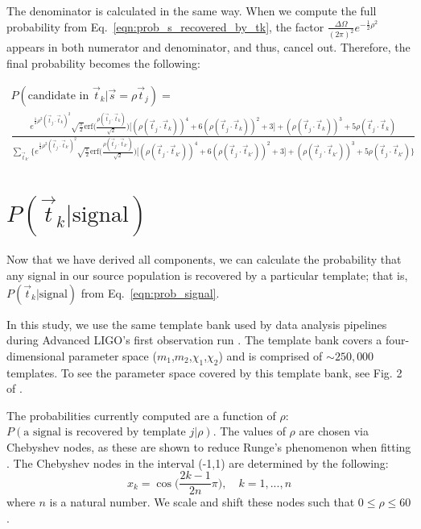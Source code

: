 \documentclass[twocolumn,showpacs,unsortedaddress,superscriptaddress,showkeys,nofootinbib,preprintnumbers,letterpaper]{revtex4-1}
\newcommand{\ptjtk}{\rho(\vec{t}_j\cdot\vec{t}_k)}
\newcommand{\tjtk}{(\vec{t}_j\cdot\vec{t}_k)}
\newcommand{\tjtkk}{(\vec{t}_j\cdot\vec{t}_{k'})}
\newcommand{\ptjtkk}{\rho(\vec{t}_j\cdot\vec{t}_{k'})}
\begin{document}
The denominator is calculated in the same way. When we compute the full probability from Eq.~\ref{eqn:prob_s_recovered_by_tk}, the factor $\frac{\Delta\Omega}{(2\pi)^{2}} e^{-\frac{1}{2}\rho^2}$ appears in both numerator and denominator, and thus, cancel out. Therefore, the final probability becomes the following:
	\begin{widetext}
	\begin{multline}
	P(\text{candidate in }\vec{t}_k|\vec{s}=\rho\vec{t}_j) =\\
	\frac{
	e^{\frac{1}{2}\rho^2\tjtk^2}
	\sqrt{\frac{\pi}{2}}\text{erf}\Big(\frac{\ptjtk}{\sqrt{2}}\Big)\Big[(\ptjtk)^4+6(\ptjtk)^2+3\Big]
	      + (\ptjtk)^3+5\ptjtk
	}{
	{\sum_{\vec{t}_{k'}} \Big\{e^{\frac{1}{2}\rho^2\tjtkk^2} 
	\sqrt{\frac{\pi}{2}}\text{erf}\Big(\frac{\ptjtkk}{\sqrt{2}}\Big)\Big[(\ptjtkk)^4+6(\ptjtkk)^2+3\Big]
	      + (\ptjtkk)^3+5\ptjtkk
	\Big\}
	}}
	\label{eqn:p_k}
	\end{multline}
	\end{widetext}


\section{$P(\vec{t}_k | \text{signal})$} \label{sec:P_jk}

Now that we have derived all components, we can calculate the probability that any signal in our source population is recovered by a particular template; that is, $P(\vec{t}_k | \text{signal})$ from Eq.~\ref{eqn:prob_signal}.

In this study, we use the same template bank used by data analysis pipelines during Advanced LIGO's first observation run \cite{TheLIGOScientific:2016pea}. The template bank covers a four-dimensional parameter space ($m_1$,$m_2$,$\chi_1$,$\chi_2$) and is comprised of $\sim\!250,000$ templates. To see the parameter space covered by this template bank, see Fig. 2 of \cite{TheLIGOScientific:2016pea}.

The probabilities currently computed are a function of $\rho$: $P(\text{a signal is recovered by template }j|\rho)$. The values of $\rho$ are chosen via Chebyshev nodes, as these are shown to reduce Runge's phenomenon when fitting \cite{numericalmethodsMATLAB}. The Chebyshev nodes in the interval (-1,1) are determined by the following:
	\begin{equation}
	x_k = \cos\Big(\frac{2k-1}{2n}\pi\Big), \quad k=1,...,n
	\end{equation}
where $n$ is a natural number. We scale and shift these nodes such that $0\le\rho\le60$.
\end{document}
